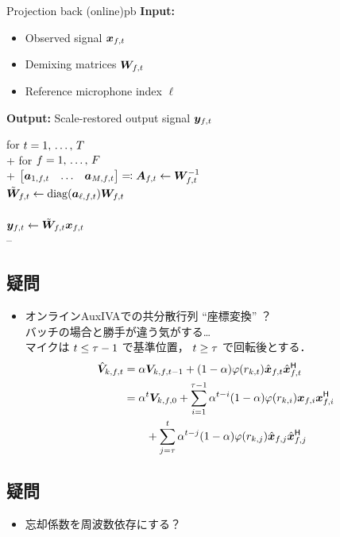 \documentclass[twocolumn,9pt,dvipdfmx]{article}
\begin{document}
\begin{algorithm}{Projection back (online)}{pb}
  \textbf{Input:}
    \begin{itemize}
      \item Observed signal $\Obs _{\ft}$
      \item Demixing matrices $\Demix _{\ft}$
      \item Reference microphone index $\ell$
    \end{itemize}
  \textbf{Output:} Scale-restored output signal $\Est _{\ft}$
  \begin{pseudo}
    for $t = 1,\, \dots,\, T$ \\+
      for $f = 1,\, \dots,\, F$ \\+
        $\begin{bmatrix} \steer _{1,\ft} & \dots & \steer _{\Mic,\ft} \end{bmatrix} \eqqcolon \Steer _{\ft} \gets \Demix _{\ft} ^{-1}$ \\
        $\tilde{\Demix} _{\ft} \gets \mathrm{diag}(\steer _{\ell,\ft}) \Demix _{\ft}$ \\
         \\
        $\Est _{\ft} \gets \tilde{\Demix} _{\ft} \Obs _{\ft}$ \\--
  \end{pseudo}
\end{algorithm}

\subsection*{疑問}
\begin{itemize}
  \item オンラインAuxIVAでの共分散行列 ``座標変換'' ？\\ バッチの場合と勝手が違う気がする…\\
    マイクは $t \leq \tau - 1$ で基準位置，
    $t \geq \tau$ で回転後とする．
    \begin{align*}
      \rot{\cov} _{\src,\ft} &= \forget \cov _{\src,\ft[-1]} + (1 - \forget) \weight(\var _{\src,\tframe}) \rot{\Obs} _{\ft} \rot{\Obs} _{\ft} ^{\hermite} \\
                             &= \forget ^{\tframe} \cov _{\src,\freq,0}
                                + \sum _{i = 1} ^{\rotFra - 1} \forget ^{\tframe - i} (1 - \forget) \weight(\var _{\src,i}) \Obs _{\freq,i} \Obs _{\freq,i} ^{\hermite} \\
                             &\qquad + \sum _{j = \rotFra} ^{\tframe} \forget ^{\tframe - j} (1 - \forget) \weight(\var _{\src,j}) \rot{\Obs} _{\freq,j} \rot{\Obs} _{\freq,j} ^{\hermite}
    \end{align*}
\end{itemize}

\subsection*{疑問}
\begin{itemize}
  \item 忘却係数を周波数依存にする？
\end{itemize}
\end{document}

